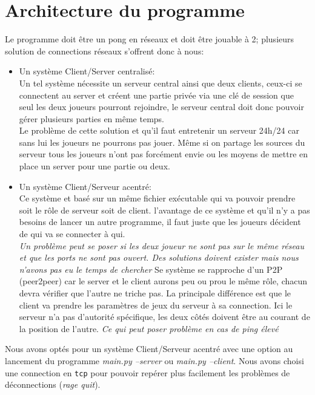 \documentclass[12pt]{report}
\begin{document}
\chapter{Architecture du programme}
Le programme doit être un pong en réseaux et doit être jouable à 2;
plusieurs solution de connections réseaux s'offrent donc à nous:
\begin{itemize}
\item Un système Client/Server centralisé: \\
  Un tel système nécessite un serveur central ainsi que deux clients, ceux-ci se
  connectent au server et créent une partie privée via une clé de
  session que seul les deux joueurs pourront rejoindre, le serveur
  central doit donc pouvoir gérer plusieurs parties en même temps. \\
  Le problème de cette solution et qu'il faut entretenir un serveur 24h/24
  car sans lui les joueurs ne pourrons pas jouer.
  Même si on partage les sources du serveur tous les joueurs n'ont pas forcément
  envie ou les moyens de mettre en place un server pour une partie ou deux.
\item Un système Client/Serveur acentré: \\
  Ce système et basé sur un même fichier exécutable qui va pouvoir prendre
  soit le rôle de serveur soit de client. l'avantage de ce système et qu'il n'y
  a pas besoins de lancer un autre programme, il faut juste que les
  joueurs décident de qui va se connecter à qui. \\
  \textit{Un problème peut se poser si les deux joueur ne sont pas sur le même
    réseau et que les ports ne sont pas ouvert. Des solutions doivent exister
    mais nous n'avons pas eu le temps de chercher}
  Se système se rapproche d'un P2P (peer2peer) car le server et le client
  aurons peu ou prou le même rôle, chacun devra vérifier que l'autre ne triche
  pas. La principale différence est que le client va prendre les paramètres de
  jeux du serveur à sa connection.
  Ici le serveur n'a pas d'autorité spécifique, les deux côtés doivent être au
  courant de la position de l'autre.
  \textit{Ce qui peut poser problème en cas de ping élevé}
\end{itemize}
Nous avons optés pour un système Client/Serveur acentré avec une option au
lancement du programme \textit{main.py --server} ou \textit{main.py --client}.
Nous avons choisi une connection en \texttt{tcp} pour pouvoir repérer plus
facilement les problèmes de déconnections (\textit{rage quit}).
\end{document}
